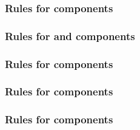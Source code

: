 \begin{sbmlenum}

\end{sbmlenum} \subsubsection*{Rules for  components} \begin{sbmlenum}


\end{sbmlenum} \subsubsection*{Rules for  and  components} \begin{sbmlenum}


\end{sbmlenum} \subsubsection*{Rules for  components} \begin{sbmlenum}


\end{sbmlenum} \subsubsection*{Rules for  components} \begin{sbmlenum}


\end{sbmlenum} \subsubsection*{Rules for  components} \begin{sbmlenum}


\end{sbmlenum}
